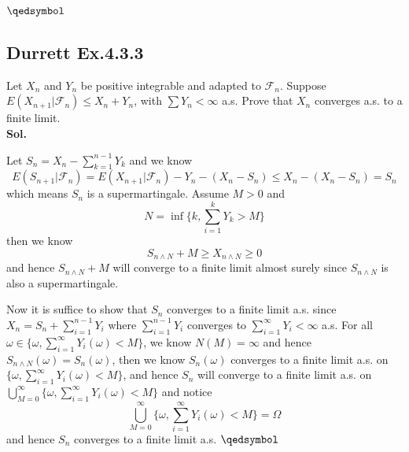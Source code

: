 \documentclass[lang=en,11pt,a4paper,citestyle =authoryear]{elegantpaper}
\newcommand{\prvd}{$\hfill \qedsymbol$}
\newcommand{\F}{\mathcal{F}}
\begin{document}
\prvd
\vspace{0.5em}

\subsection*{Durrett Ex.4.3.3} 
Let $X_n$ and $Y_n$ be positive integrable and adapted to $\F_n$. Suppose $E(X_{n+1}|\F_n) \leq X_n + Y_n$, with $\sum Y_n < \infty$ a.s. Prove that $X_n$ converges a.s. to a finite limit.
\vspace{0.5em}\\
\textbf{Sol.} \par
Let $S_n = X_n - \sum\limits_{k=1}^{n-1}Y_k$ and we know
\[
E(S_{n+1}|\F_n) = E(X_{n+1}|\F_n) - Y_n - (X_n - S_n) \leq X_n - (X_n - S_n) = S_n
\]
which means $S_n$ is a supermartingale. Assume $M>0$ and
\[N = \inf\{k,\sum\limits_{i=1}^k Y_k > M\}\]
then we know
\[S_{n\wedge N} + M \geq X_{n\wedge N} \geq 0\]
and hence $S_{n\wedge N} + M$ will converge to a finite limit almost surely since $S_{n\wedge N}$ is also a supermartingale.\par
Now it is suffice to show that $S_n$ converges to a finite limit a.s. since $X_n = S_n + \sum\limits_{i=1}^{n-1}Y_i$ where $\sum\limits_{i=1}^{n-1}Y_i$ converges to $\sum\limits_{i=1}^{\infty} Y_i < \infty$ a.s. For all $\omega \in \{\omega,\sum\limits_{i=1}^{\infty} Y_i(\omega)< M\}$, we know $N(M) = \infty$ and hence $S_{n\wedge N}(\omega) = S_n(\omega)$, then we know $S_n(\omega)$ converges to a finite limit a.s. on $\{\omega,\sum\limits_{i=1}^{\infty} Y_i(\omega)<M\}$, and hence $S_n$ will converge to a finite limit a.s. on $\bigcup_{M=0}^{\infty}\{\omega,\sum\limits_{i=1}^{\infty} Y_i(\omega)<M\}$ and notice
\[\bigcup_{M=0}^{\infty}\{\omega,\sum\limits_{i=1}^{\infty} Y_i(\omega)<M\} = \Omega\]
and hence $S_n$ converges to a finite limit a.s. 
\prvd
\vspace{0.5em}
\end{document}

